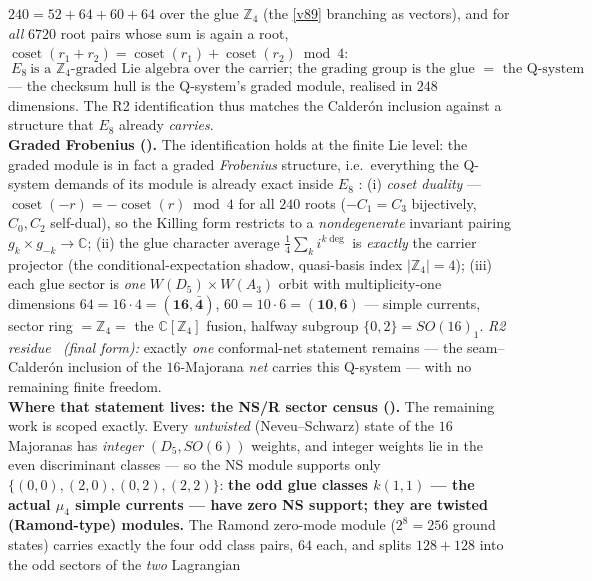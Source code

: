 \documentclass[11pt,a4paper]{article}
\newcommand{\Z}{\mathbb Z}
\begin{document}
$240=52+64+60+64$ over the glue $\Z_4$ (the \vref{v89} branching as vectors), and for \emph{all} $6720$ root
pairs whose sum is again a root, $\operatorname{coset}(r_1{+}r_2)=\operatorname{coset}(r_1)+
\operatorname{coset}(r_2)\bmod4$:
\[
  \boxed{\ E_8\ \text{is a $\Z_4$-graded Lie algebra over the carrier; the grading group is the glue
  $=$ the Q-system}\ }
\]
--- the checksum hull is the Q-system's graded module, realised in $248$ dimensions. The R2
identification thus matches the Calder\'on inclusion against a structure that $E_8$ already
\emph{carries}. 
\smallskip\\
\noindent\textbf{Graded Frobenius ().} The identification holds at the
finite Lie level: the graded module is in fact a graded \emph{Frobenius} structure,
i.e.\ everything the Q-system demands of its module is already exact inside $E_8$ \mE: (i) \emph{coset
duality} --- $\operatorname{coset}(-r)=-\operatorname{coset}(r)\bmod4$ for all $240$ roots ($-C_1=C_3$
bijectively, $C_0,C_2$ self-dual), so the Killing form restricts to a \emph{nondegenerate} invariant
pairing $g_k\times g_{-k}\to\mathbb C$; (ii) the glue character average $\tfrac14\sum_k i^{k\deg}$ is
\emph{exactly} the carrier projector (the conditional-expectation shadow, quasi-basis index $|\Z_4|=4$);
(iii) each glue sector is \emph{one} $W(D_5){\times}W(A_3)$ orbit with multiplicity-one dimensions
$64=16\cdot4=(\mathbf{16},\bar{\mathbf4})$, $60=10\cdot6=(\mathbf{10},\mathbf6)$ --- simple currents,
sector ring $=\Z_4=$ the $\mathbb C[\Z_4]$ fusion, halfway subgroup $\{0,2\}=SO(16)_1$. \emph{R2 residue
\mC\ (final form):} exactly \emph{one} conformal-net statement remains --- the seam--Calder\'on inclusion
of the $16$-Majorana \emph{net} carries this Q-system --- with no remaining finite freedom.
\smallskip\\
\noindent\textbf{Where that statement lives: the NS/R sector census ().}
The remaining work is scoped exactly. Every \emph{untwisted} (Neveu--Schwarz) state of the $16$
Majoranas has \emph{integer} $(D_5,SO(6))$ weights, and integer weights lie in the even discriminant
classes --- so the NS module supports only $\{(0,0),(2,0),(0,2),(2,2)\}$: \textbf{the odd glue classes
$k(1,1)$ --- the actual $\mu_4$ simple currents --- have zero NS support; they are twisted
(Ramond-type) modules.} The Ramond zero-mode module ($2^8=256$ ground states) carries exactly the four
odd class pairs, $64$ each, and splits $128+128$ into the odd sectors of the \emph{two} Lagrangian
\end{document}
